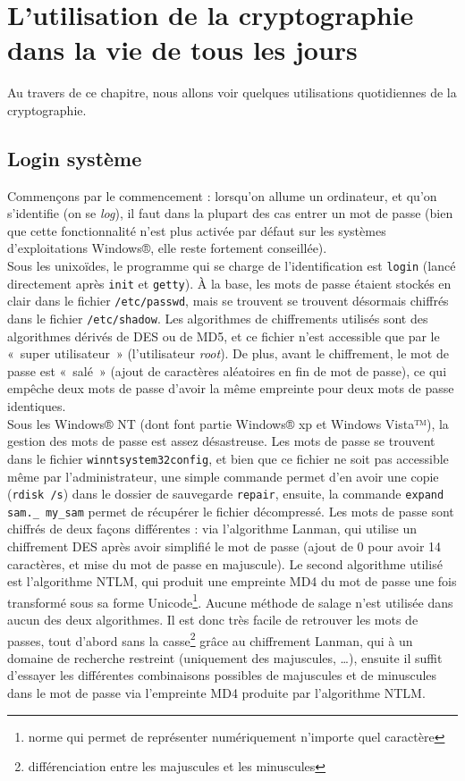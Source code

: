 \section{L'utilisation de la cryptographie dans la vie de tous les
jours}
Au travers de ce chapitre, nous allons voir quelques utilisations
quotidiennes de la cryptographie.
 
\subsection{Login système}
Commençons par le commencement : lorsqu'on allume un ordinateur,
et qu'on s'identifie (on se \emph{log}), il faut dans la plupart
des cas entrer un mot de passe (bien que cette fonctionnalité
n'est plus activée par défaut sur les systèmes d'exploitations
Windows®, elle reste fortement conseillée).
\\
 
Sous les unixoïdes, le programme qui se charge de
l'identification est \texttt{login} (lancé directement après
\texttt{init} et \texttt{getty}). À la base, les mots de passe
étaient stockés en clair dans le fichier \texttt{/etc/passwd},
mais se trouvent se trouvent désormais chiffrés dans le
fichier \texttt{/etc/shadow}. Les algorithmes de chiffrements
utilisés sont des algorithmes dérivés de DES ou de MD5, et ce
fichier n'est accessible que par le «~super utilisateur~»
(l'utilisateur \emph{root}). De plus, avant le chiffrement, le mot
de passe est «~salé~» (ajout de caractères aléatoires en fin de
mot de passe), ce qui empêche deux mots de passe d'avoir
la même empreinte pour deux mots de passe identiques.
\\
 
Sous les Windows® NT (dont font partie Windows® xp et Windows
Vista™), la gestion des mots de passe est assez désastreuse. Les
mots de passe se trouvent dans le fichier
\texttt{\bslash winnt\bslash system32\bslash config}, et bien
que ce fichier ne soit pas
accessible même par l'administrateur, une simple commande permet
d'en avoir une copie (\texttt{rdisk /s}) dans le dossier de
sauvegarde \texttt{repair}, ensuite, la commande \texttt{expand
sam.\_ my\_sam}
permet de récupérer le fichier décompressé.
Les mots de passe sont chiffrés de deux façons différentes : via
l'algorithme Lanman, qui utilise un chiffrement DES après avoir
simplifié le mot de passe (ajout de 0 pour avoir 14 caractères, et
mise du mot de passe en majuscule).
Le second algorithme utilisé est l'algorithme NTLM, qui produit
une empreinte MD4 du mot de passe une fois transformé sous sa
forme Unicode\footnote{norme qui permet de représenter
numériquement n'importe quel caractère}.
 Aucune méthode de salage n'est utilisée dans aucun
des deux algorithmes. Il est donc très facile de retrouver les
mots de passes, tout d'abord sans la casse\footnote{différenciation
entre les majuscules et les minuscules} grâce au chiffrement
Lanman, qui à un domaine de recherche restreint (uniquement des
majuscules, …), ensuite il suffit d'essayer les différentes
combinaisons possibles de majuscules et de minuscules dans le mot
de passe via l'empreinte MD4 produite par l'algorithme NTLM.
\\
 
